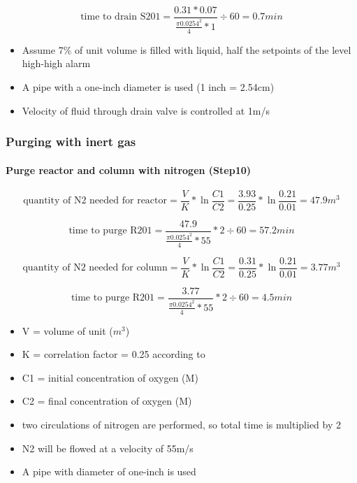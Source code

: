     \begin{equation}
        \text{time to drain S201} = \frac{0.31 * 0.07}{\frac{\pi 0.0254^2}{4} * 1} \div 60 =0.7 min
    \end{equation}
    
    \begin{itemize}
        \item Assume 7\% of unit volume is filled with liquid, half the setpoints of the level high-high alarm
        \item A pipe with a one-inch diameter is used (1 inch = 2.54cm)
        \item Velocity of fluid through drain valve is controlled at 1m/s
    \end{itemize}

\subsubsection{Purging with inert gas} 
\paragraph{Purge reactor and column with nitrogen (Step10)}

    \begin{equation}
        \text{quantity of N2 needed for reactor} = \frac{V}{K} * \ln \frac{C1}{C2} = \frac{3.93}{0.25} * \ln \frac{0.21}{0.01} = 47.9 m^3
    \end{equation}
    
    \begin{equation}
        \text{time to purge R201} = \frac{47.9}{\frac{\pi 0.0254^2}{4} * 55} * 2 \div 60 = 57.2 min
    \end{equation}
    
    \begin{equation}
        \text{quantity of N2 needed for column} = \frac{V}{K} * \ln \frac{C1}{C2} = \frac{0.31}{0.25} * \ln \frac{0.21}{0.01} = 3.77 m^3
    \end{equation}
    
    \begin{equation}
        \text{time to purge R201} = \frac{3.77}{\frac{\pi 0.0254^2}{4} * 55} * 2 \div 60 = 4.5 min
    \end{equation}
    
    \begin{itemize}
        \item V = volume of unit ($m^3$)
        \item K = correlation factor = 0.25 according to \textcite{kinsley_properly_2001}
        \item C1 = initial concentration of oxygen (M)
        \item C2 = final concentration of oxygen (M)
        \item two circulations of nitrogen are performed, so total time is multiplied by 2
        \item N2 will be flowed at a velocity of 55m/s
        \item A pipe with diameter of one-inch is used
    \end{itemize}


